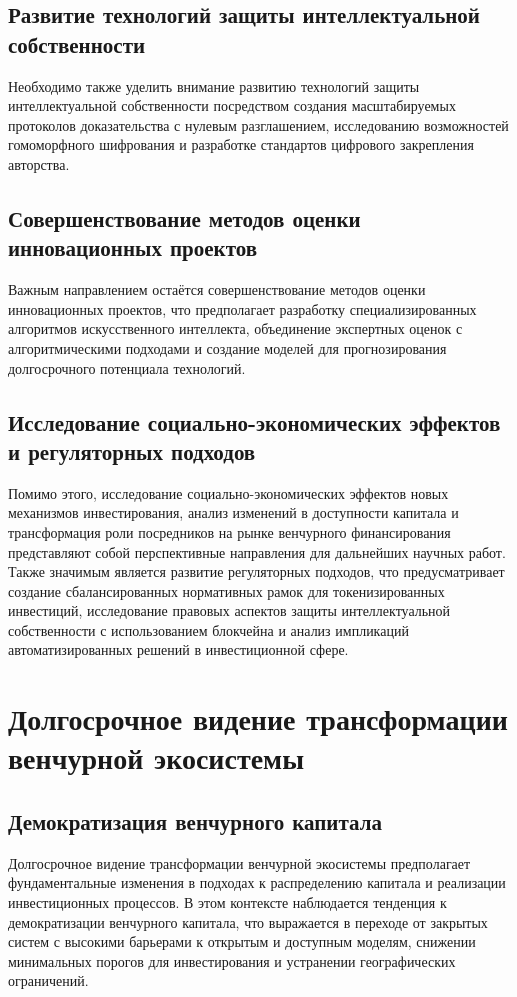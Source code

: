 \documentclass[
    candidate, %
    subf, %
    dotsinheaders=false,
]{disser}
\begin{document}
\subsection{Развитие технологий защиты интеллектуальной собственности}
Необходимо также уделить внимание развитию технологий защиты интеллектуальной собственности посредством создания масштабируемых протоколов доказательства с нулевым разглашением, исследованию возможностей гомоморфного шифрования и разработке стандартов цифрового закрепления авторства.

\subsection{Совершенствование методов оценки инновационных проектов}
Важным направлением остаётся совершенствование методов оценки инновационных проектов, что предполагает разработку специализированных алгоритмов искусственного интеллекта, объединение экспертных оценок с алгоритмическими подходами и создание моделей для прогнозирования долгосрочного потенциала технологий.

\subsection{Исследование социально-экономических эффектов и регуляторных подходов}
Помимо этого, исследование социально-экономических эффектов новых механизмов инвестирования, анализ изменений в доступности капитала и трансформация роли посредников на рынке венчурного финансирования представляют собой перспективные направления для дальнейших научных работ. Также значимым является развитие регуляторных подходов, что предусматривает создание сбалансированных нормативных рамок для токенизированных инвестиций, исследование правовых аспектов защиты интеллектуальной собственности с использованием блокчейна и анализ импликаций автоматизированных решений в инвестиционной сфере.

\section{Долгосрочное видение трансформации венчурной экосистемы}

\subsection{Демократизация венчурного капитала}
Долгосрочное видение трансформации венчурной экосистемы предполагает фундаментальные изменения в подходах к распределению капитала и реализации инвестиционных процессов. В этом контексте наблюдается тенденция к демократизации венчурного капитала, что выражается в переходе от закрытых систем с высокими барьерами к открытым и доступным моделям, снижении минимальных порогов для инвестирования и устранении географических ограничений.
\end{document}
